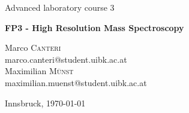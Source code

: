 \documentclass[a4paper,10pt]{article}
\begin{document}
\begin{titlepage}
 \begin{center}
	\Large{Advanced laboratory course 3}
	\end{center}
	\begin{center}
	 \LARGE{\textbf{FP3 - High Resolution Mass Spectroscopy}}
	\end{center}

	\begin{center}

	\large Marco \textsc{Canteri} \\
	marco.canteri@student.uibk.ac.at\\
	\large Maximilian \textsc{Münst} \\
	maximilian.muenst@student.uibk.ac.at
	\end{center}

	\begin{center}
	\vspace{1cm}
	Innsbruck, \today
	\vspace{1cm}
	\end{center}

	\begin{abstract}
		In the course of this experiment a high resolution long time measurement of the mass spectrum of Angiotensin I was conducted using a FT-ICR mass spectrometer. Furthermore, fragments of CID collision were recorded over a collision energy range from \num{0} to \SI{20}{\electronvolt}. Finally, mass spectra of SORI-CID fragments were measured for several SORI-power settings.
    \end{abstract}
    \vspace{1cm}


\end{titlepage}
\end{document}
